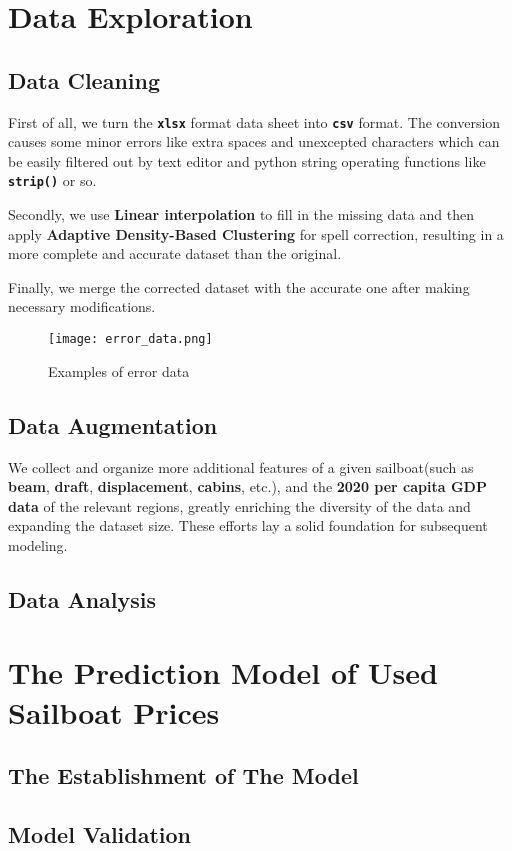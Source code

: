 \documentclass[12pt]{article}  %
\begin{document}
\section{Data Exploration}
\subsection{Data Cleaning}
First of all, we turn the \textbf{\texttt{xlsx}} format data sheet into \textbf{\texttt{csv}} format. 
The conversion causes some minor errors like extra spaces and unexcepted characters which can be easily filtered out by text editor and python string operating functions like \textbf{\texttt{strip()}} or so.

Secondly, we use \textbf{Linear interpolation} to fill in the missing data and then apply \textbf{Adaptive Density-Based Clustering} for spell correction,
resulting in a more complete and accurate dataset than the original.

Finally, we merge the corrected dataset with the accurate one after making necessary modifications.
\begin{figure}[htbp]
    \centering
    \texttt{[image: error\_data.png]}
    \caption{Examples of error data}\label{fig:error_data}
    \end{figure}

\subsection{Data Augmentation}
We collect and organize more additional features of a given sailboat(such as \textbf{beam}, \textbf{draft}, \textbf{displacement}, \textbf{cabins}, etc.),
and the \textbf{2020 per capita GDP data} of the relevant regions, 
greatly enriching the diversity of the data and expanding the dataset size. 
These efforts lay a solid foundation for subsequent modeling.
\subsection{Data Analysis}


\section{The Prediction Model of Used Sailboat Prices}
\subsection{The Establishment of The Model}
\subsection{Model Validation}
\end{document}
